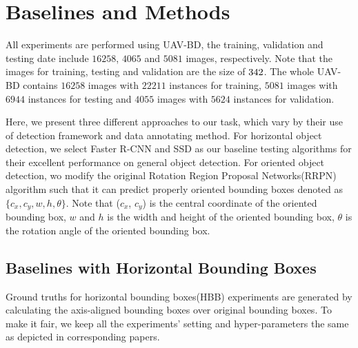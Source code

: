 \section{Baselines and Methods}
\label{sec:exp}


All experiments are performed using UAV-BD, the training, validation and testing date include $ 16258 $, $ 4065 $ and $ 5081 $ images, respectively. Note that the images for training, testing and validation are the size of $ 342 \time 342 $. The whole UAV-BD contains $ 16258 $ images with $ 22211 $ instances for training, $ 5081 $ images with $ 6944 $ instances for testing and $ 4055 $ images with $ 5624 $ instances for validation.


Here, we present three different approaches to our task, which vary by their use of detection framework and data annotating method. For horizontal object detection, we select Faster R-CNN\cite{FasterRCNN} and SSD\cite{SSD} as our baseline testing algorithms for their excellent performance on general object detection. For oriented object detection, wo modify the original Rotation Region Proposal Networks(RRPN) algorithm\cite{RRPN} such that it can predict properly oriented bounding boxes denoted as $ \{c_x, c_y, w, h, \theta\} $. Note that ($ c_x $, $ c_y $) is the central coordinate of the oriented bounding box, $ w $ and $ h $ is the width and height of the oriented bounding box, $ \theta $ is the rotation angle of the oriented bounding box.

%	
%	
%	
%	


\subsection{Baselines with Horizontal Bounding Boxes}

Ground truths for horizontal bounding boxes(HBB) experiments are generated by calculating the axis-aligned bounding boxes over original bounding boxes. To make it fair, we keep all the experiments' setting and hyper-parameters the same as depicted in corresponding papers\cite{FasterRCNN, SSD, YOLOv2}.


